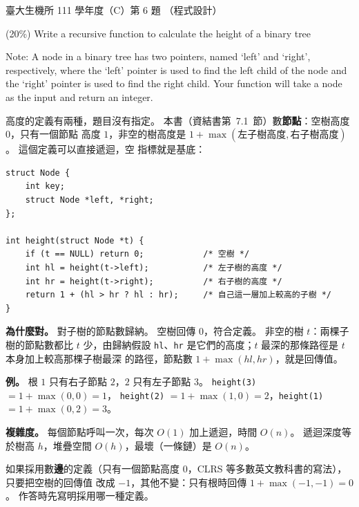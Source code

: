 \begin{pastexam}[label={px:ntu-111-bime-ds-06}]{臺大生機所 111 學年度（C）第 6 題}
（程式設計）

(20\%) Write a recursive function to calculate the height of a binary tree

Note: A node in a binary tree has two pointers, named `left' and `right', respectively, where the
`left' pointer is used to find the left child of the node and the `right' pointer is used to find
the right child. Your function will take a node as the input and return an integer.
\end{pastexam}

\begin{pastsoln}
高度的定義有兩種，題目沒有指定。 本書（資結書第~7.1~節）數\textbf{節點}：空樹高度 $0$，只有一個節點
高度 $1$，非空的樹高度是 $1 + \max(\text{左子樹高度}, \text{右子樹高度})$。 這個定義可以直接遞迴，空
指標就是基底：
\begin{verbatim}
struct Node {
    int key;
    struct Node *left, *right;
};

int height(struct Node *t) {
    if (t == NULL) return 0;            /* 空樹 */
    int hl = height(t->left);           /* 左子樹的高度 */
    int hr = height(t->right);          /* 右子樹的高度 */
    return 1 + (hl > hr ? hl : hr);     /* 自己這一層加上較高的子樹 */
}
\end{verbatim}

\textbf{為什麼對。} 對子樹的節點數歸納。 空樹回傳 $0$，符合定義。 非空的樹 $t$：兩棵子樹的節點數都比 $t$
少，由歸納假設 \texttt{hl}、\texttt{hr} 是它們的高度；$t$ 最深的那條路徑是 $t$ 本身加上較高那棵子樹最深
的路徑，節點數 $1 + \max(\mathit{hl}, \mathit{hr})$，就是回傳值。

\textbf{例。} 根 $1$ 只有右子節點 $2$，$2$ 只有左子節點 $3$。 \texttt{height(3)} $= 1 + \max(0, 0) = 1$，
\texttt{height(2)} $= 1 + \max(1, 0) = 2$，\texttt{height(1)} $= 1 + \max(0, 2) = 3$。

\textbf{複雜度。} 每個節點呼叫一次，每次 $O(1)$ 加上遞迴，時間 $O(n)$。 遞迴深度等於樹高 $h$，堆疊空間
$O(h)$，最壞（一條鏈）是 $O(n)$。

如果採用數\textbf{邊}的定義（只有一個節點高度 $0$，CLRS 等多數英文教科書的寫法），只要把空樹的回傳值
改成 $-1$，其他不變：只有根時回傳 $1 + \max(-1, -1) = 0$。 作答時先寫明採用哪一種定義。
\end{pastsoln}
